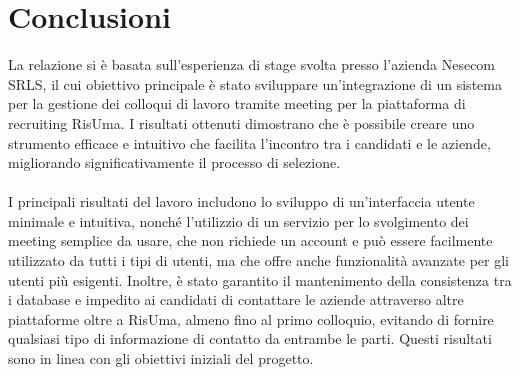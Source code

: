 \chapter{Conclusioni}
La relazione si è basata sull'esperienza di stage svolta presso l'azienda Nesecom SRLS, 
il cui obiettivo principale è stato sviluppare un'integrazione di un sistema per la gestione dei colloqui 
di lavoro tramite meeting per la piattaforma di recruiting RisUma. I risultati ottenuti dimostrano che è possibile creare 
uno strumento efficace e intuitivo che facilita l'incontro tra i candidati e le aziende, migliorando significativamente il 
processo di selezione.
\\
\\
I principali risultati del lavoro includono lo sviluppo di un'interfaccia utente minimale e intuitiva, nonché l'utilizzio di un servizio per 
lo svolgimento dei meeting semplice da usare, che non richiede un account e può essere facilmente utilizzato da tutti i tipi di utenti, 
ma che offre anche funzionalità avanzate per gli utenti più esigenti. Inoltre, è stato garantito il mantenimento della consistenza tra 
i database e impedito ai candidati di contattare le aziende attraverso altre piattaforme oltre a RisUma, almeno fino al primo colloquio, 
evitando di fornire qualsiasi tipo di informazione di contatto da entrambe le parti. 
Questi risultati sono in linea con gli obiettivi iniziali del progetto.
